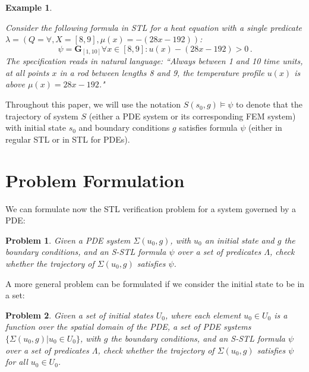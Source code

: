 \documentclass[letterpaper, 10 pt, conference]{ieeeconf/ieeeconf}
\newtheorem{problem}{Problem}
\newtheorem{example}{Example}
\newcommand{\Always}{\mathbf{G}}
\begin{document}
\begin{example}
    \label{ex:stl}

    Consider the following formula in STL for a heat equation with a single predicate
    $\lambda = (Q = \forall, X = [8, 9], \mu(x) = -(28x - 192))$:
%
    \begin{equation}
        \psi = \Always_{[1,10]} \forall x \in [8,9] : u(x) - (28x - 192) > 0 \,.
    \end{equation}
%
    The specification reads in natural language: ``Always between 1 and 10 time
    units, at all points $x$ in a rod between lengths 8 and 9, the temperature
    profile $u(x)$ is above $\mu(x) = 28x - 192$."

\end{example}

Throughout this paper, we will use the notation $S(s_0, g) \models \psi$ to denote
that the trajectory of system $S$ (either a PDE system or its corresponding FEM
system) with initial state $s_0$ and boundary conditions $g$ satisfies formula 
$\psi$ (either in regular STL or in STL for PDEs).

\section{Problem Formulation}
\label{sec:problem_formulation}

We can formulate now the STL verification problem for a system governed by a
PDE:

\begin{problem}
\label{pr:stl}
    Given a PDE system $\Sigma(u_0, g)$, with $u_0$ an initial state and $g$
    the boundary conditions, and an S-STL formula $\psi$ over a set of
    predicates $\Lambda$, check whether the trajectory of $\Sigma(u_0, g)$
    satisfies $\psi$.
\end{problem}

A more general problem can be formulated if we consider the initial state to be
in a set:

\begin{problem}
\label{pr:stl_set}
    Given a set of initial states $U_0$, where each element $u_0 \in U_0$ is a
    function over the spatial domain of the PDE, a set of PDE systems
    $\{\Sigma(u_0, g) | u_0 \in U_0\}$, with $g$
    the boundary conditions, and an S-STL formula $\psi$ over a set of
    predicates $\Lambda$, check whether the trajectory of $\Sigma(u_0, g)$
    satisfies $\psi$ for all $u_0 \in U_0$.
\end{problem}
\end{document}
